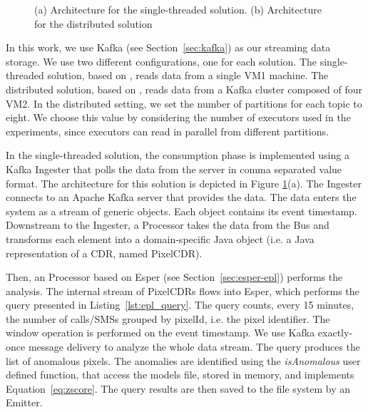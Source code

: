 {\begin{figure}[ht]
\caption{(a) Architecture for the single-threaded solution. (b) Architecture for the distributed solution}
\label{fig:arch_impl}
\end{figure}

In this work, we use Kafka (see Section~\ref{sec:kafka}) as our streaming data storage. We use two different configurations, one for each solution. The single-threaded solution, based on \sti{}, reads data from a single VM1 machine. The distributed solution, based on \sparkdi{}, reads data from a Kafka cluster composed of four VM2. In the distributed setting, we set the number of partitions for each topic to eight. We choose this value by considering the number of executors used in the experiments, since executors can read in parallel from different partitions.

In the single-threaded solution, the consumption phase is implemented using a Kafka Ingester that polls the data from the server in comma separated value format. The architecture for this solution is depicted in Figure \ref{fig:arch_impl}(a). The Ingester connects to an Apache Kafka server that provides the data. The data enters the system as a stream of generic objects. Each object contains its event timestamp. Downstream to the Ingester, a Processor takes the data from the Bus and transforms each element into a domain-specific Java object (i.e. a Java representation of a CDR, named PixelCDR).

Then, an Processor based on Esper (see Section~\ref{sec:esper-epl}) performs the analysis. The internal stream of PixelCDRs flows into Esper, which performs the query presented in Listing~\ref{lst:epl_query}. The query counts, every 15 minutes, the number of calls/SMSs grouped by pixelId, i.e. the pixel identifier.
The window operation is performed on the event timestamp. We use Kafka exactly-once message delivery to analyze the whole data stream. The query produces the list of anomalous pixels.
The anomalies are identified using the \textit{isAnomalous} user defined function, that access the models file, stored in memory, and implements Equation~\eqref{eq:zscore}.
The query results are then saved to the file system by an Emitter.

}

